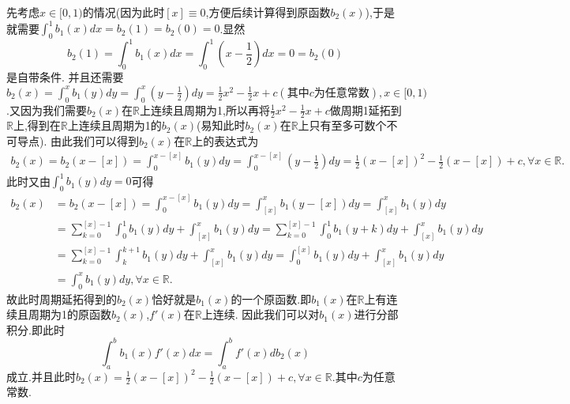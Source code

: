 \documentclass[lang=cn,newtx,10pt,scheme=chinese]{elegantbook}
\begin{document}
\begin{remark}
先考虑$x\in [0,1)$的情况(因为此时$[x]\equiv0$,方便后续计算得到原函数$b_2(x)$),于是就需要\(\int_0^1{b_1(x)dx}=b_2\left( 1 \right) =b_2\left( 0 \right) =0\).显然
\[
b_2(1)=\int_{0}^{1}b_1(x)dx=\int_{0}^{1}\left(x-\frac{1}{2}\right)dx = 0 =b_2(0)
\]
是自带条件.
并且还需要\(b_2(x)=\int_0^x{b_1\left( y \right) dy}=\int_0^x{\left( y-\frac{1}{2} \right) dy}=\frac{1}{2}x^2-\frac{1}{2}x + c(\text{其中}c\text{为任意常数}),x\in[0,1)\).又因为我们需要$b_2(x)$在$\mathbb{R}$上连续且周期为1,所以再将$\frac{1}{2}x^2-\frac{1}{2}x + c$做周期1延拓到$\mathbb{R}$上,得到在$\mathbb{R}$上连续且周期为1的$b_2(x)$(易知此时$b_2(x)$在$\mathbb{R}$上只有至多可数个不可导点).
由此我们可以得到$b_2(x)$在$\mathbb{R}$上的表达式为
\begin{align*}
   b_2\left( x \right) =b_2\left( x-\left[ x \right] \right) =\int_0^{x-\left[ x \right]}{b_1\left( y \right) dy}=\int_0^{x-\left[ x \right]}{\left( y-\frac{1}{2} \right) dy}=\frac{1}{2}\left( x-\left[ x \right] \right) ^2-\frac{1}{2}\left( x-\left[ x \right] \right) +c,\forall x\in \mathbb{R} .
\end{align*}
此时又由$\int_0^1{b_1\left( y \right) dy}=0$可得
\begin{align*}
   b_2\left( x \right) &=b_2\left( x-\left[ x \right] \right) =\int_0^{x-\left[ x \right]}{b_1\left( y \right) dy}=\int_{\left[ x \right]}^x{b_1\left( y-\left[ x \right] \right) dy}=\int_{\left[ x \right]}^x{b_1\left( y \right) dy}
\\
&=\sum_{k=0}^{\left[ x \right] -1}{\int_0^1{b_1\left( y \right) dy}}+\int_{\left[ x \right]}^x{b_1\left( y \right) dy}=\sum_{k=0}^{\left[ x \right] -1}{\int_0^1{b_1\left( y+k \right) dy}}+\int_{\left[ x \right]}^x{b_1\left( y \right) dy}
\\
&=\sum_{k=0}^{\left[ x \right] -1}{\int_k^{k+1}{b_1\left( y \right) dy}}+\int_{\left[ x \right]}^x{b_1\left( y \right) dy}=\int_0^{\left[ x \right]}{b_1\left( y \right) dy}+\int_{\left[ x \right]}^x{b_1\left( y \right) dy}
\\
&=\int_0^x{b_1\left( y \right) dy},\forall x\in \mathbb{R}.
\end{align*}
故此时周期延拓得到的$b_2(x)$恰好就是$b_1(x)$的一个原函数.即$b_1(x)$在$\mathbb{R}$上有连续且周期为1的原函数$b_2(x)$,$f'(x)$在$\mathbb{R}$上连续.
因此我们可以对$b_1(x)$进行分部积分.即此时
\[
\int_{a}^{b}b_1(x)f'(x)dx=\int_{a}^{b}f'(x)db_2(x)
\]
成立.并且此时$ b_2\left( x \right)=\frac{1}{2}\left( x-\left[ x \right] \right) ^2-\frac{1}{2}\left( x-\left[ x \right] \right) +c,\forall x\in \mathbb{R}$.其中$c$为任意常数.


\end{remark}
\end{document}
